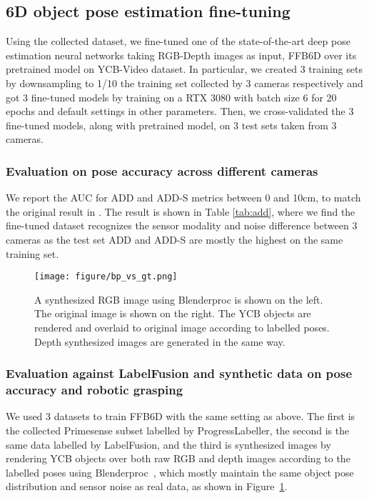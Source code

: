 \subsection{6D object pose estimation fine-tuning}
Using the collected dataset, we fine-tuned one of the state-of-the-art deep pose estimation neural networks taking RGB-Depth images as input, FFB6D \cite{he2021ffb6d} over its pretrained model on YCB-Video dataset. In particular, we created 3 training sets by downsampling to 1/10 the training set collected by 3 cameras respectively and got 3 fine-tuned models by training on a RTX 3080 with batch size 6 for 20 epochs and default settings in other parameters. Then, we cross-validated the 3 fine-tuned models, along with pretrained model, on 3 test sets taken from 3 cameras.

\subsubsection{Evaluation on pose accuracy across different cameras}
We report the AUC for ADD and ADD-S metrics between 0 and 10cm, to match the original result in \cite{he2021ffb6d}. The result is shown in Table \ref{tab:add}, where we find the fine-tuned dataset recognizes the sensor modality and noise difference between 3 cameras as the test set ADD and ADD-S are mostly the highest on the same training set. 


\begin{figure}[htbp]
    \centering
    \texttt{[image: figure/bp\_vs\_gt.png]}
    \caption{A synthesized RGB image using Blenderproc is shown on the left. The original image is shown on the right. The YCB objects are rendered and overlaid to original image according to labelled poses. Depth synthesized images are generated in the same way.}
    \label{fig:bp}
\end{figure}

\subsubsection{Evaluation against LabelFusion and synthetic data on pose accuracy and robotic grasping} We used 3 datasets to train FFB6D with the same setting as above. The first is the collected Primesense subset labelled by ProgressLabeller, the second is the same data labelled by LabelFusion, and the third is synthesized images by rendering YCB objects over both raw RGB and depth images according to the labelled poses using Blenderproc~\cite{denninger2019blenderproc}, which mostly maintain the same object pose distribution and sensor noise as real data, as shown in Figure~\ref{fig:bp}. 

